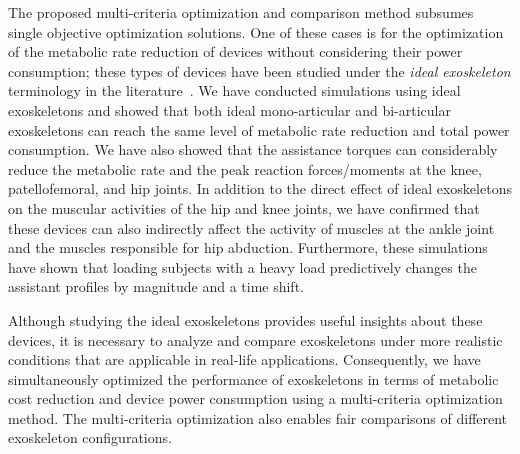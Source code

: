 \documentclass[10pt,letterpaper]{article}
\begin{document}
The proposed multi-criteria optimization and comparison method subsumes single objective optimization solutions. One of these cases is for the optimization of the metabolic rate reduction of devices without considering their power consumption; these types of devices have been studied under the \emph{ideal exoskeleton} terminology in the literature~\cite{Uchida2016_idealexo_running,Dembia2017}. We have conducted simulations using ideal exoskeletons and showed that both ideal mono-articular and bi-articular exoskeletons can reach the same level of metabolic rate reduction and total power consumption. We have also showed that the assistance torques can considerably reduce the metabolic rate and the peak reaction forces/moments at the knee, patellofemoral, and hip joints. In addition to the direct effect of ideal exoskeletons on the muscular activities of the hip and knee joints, we have confirmed that these devices can also indirectly affect the activity of muscles at the ankle joint and the muscles responsible for hip abduction. Furthermore, these simulations have shown that loading subjects with a heavy load predictively changes the assistant profiles by magnitude and a time shift.

Although studying the ideal exoskeletons provides useful insights about these devices, it is necessary to analyze and compare exoskeletons under more realistic conditions that are applicable in real-life applications. Consequently, we have simultaneously optimized the performance of exoskeletons in terms of metabolic cost reduction and device power consumption using a multi-criteria optimization method. The multi-criteria optimization also enables fair comparisons of different exoskeleton configurations. %
\end{document}
